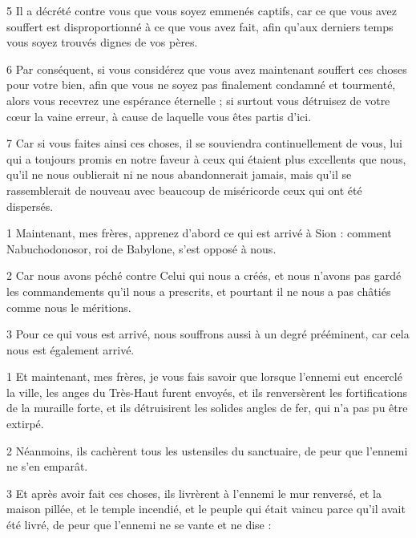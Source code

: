\par 5 Il a décrété contre vous que vous soyez emmenés captifs, car ce que vous avez souffert est disproportionné à ce que vous avez fait, afin qu'aux derniers temps vous soyez trouvés dignes de vos pères.

\par 6 Par conséquent, si vous considérez que vous avez maintenant souffert ces choses pour votre bien, afin que vous ne soyez pas finalement condamné et tourmenté, alors vous recevrez une espérance éternelle ; si surtout vous détruisez de votre cœur la vaine erreur, à cause de laquelle vous êtes partis d'ici.

\par 7 Car si vous faites ainsi ces choses, il se souviendra continuellement de vous, lui qui a toujours promis en notre faveur à ceux qui étaient plus excellents que nous, qu'il ne nous oublierait ni ne nous abandonnerait jamais, mais qu'il se rassemblerait de nouveau avec beaucoup de miséricorde ceux qui ont été dispersés.


\par 1 Maintenant, mes frères, apprenez d'abord ce qui est arrivé à Sion : comment Nabuchodonosor, roi de Babylone, s'est opposé à nous.

\par 2 Car nous avons péché contre Celui qui nous a créés, et nous n'avons pas gardé les commandements qu'il nous a prescrits, et pourtant il ne nous a pas châtiés comme nous le méritions.

\par 3 Pour ce qui vous est arrivé, nous souffrons aussi à un degré prééminent, car cela nous est également arrivé.


\par 1 Et maintenant, mes frères, je vous fais savoir que lorsque l'ennemi eut encerclé la ville, les anges du Très-Haut furent envoyés, et ils renversèrent les fortifications de la muraille forte, et ils détruisirent les solides angles de fer, qui n'a pas pu être extirpé.

\par 2 Néanmoins, ils cachèrent tous les ustensiles du sanctuaire, de peur que l'ennemi ne s'en emparât.

\par 3 Et après avoir fait ces choses, ils livrèrent à l'ennemi le mur renversé, et la maison pillée, et le temple incendié, et le peuple qui était vaincu parce qu'il avait été livré, de peur que l'ennemi ne se vante et ne dise :

